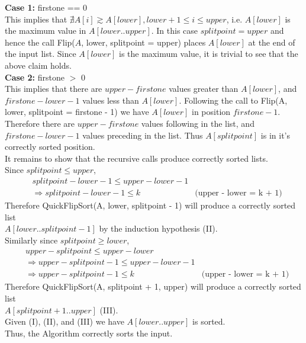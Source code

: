 \documentclass[12pt]{article}
\newenvironment{lemma}[2][Lemma]{\begin{trivlist}
\item[\hskip \labelsep {\bfseries #1}\hskip \labelsep {\bfseries #2.}]}{\end{trivlist}}
\newenvironment{question}[2][Question]{\begin{trivlist}
\item[\hskip \labelsep {\bfseries #1}\hskip \labelsep {\bfseries #2.}]}{\end{trivlist}}
\begin{document}
\begin{question}{1 (b)}
\begin{lemma}{1.5}
    \textbf{Case 1:} firstone == 0 \\
    This implies that $\nexists A[i] \gtrsim A[lower], lower + 1 \leq i \leq upper$,
    i.e. $A[lower]$ is the maximum value in $A[lower..upper]$.
    In this case $splitpoint = upper$ and hence the call Flip($A$, lower, splitpoint = upper)
    places $A[lower]$ at the end of the input list.  Since $A[lower]$ is the maximum
    value, it is trivial to see that the above claim holds. \\

    \textbf{Case 2:} firstone $>$ 0 \\
    This implies that there are $upper - firstone$ values greater than $A[lower]$,
    and $firstone - lower - 1$ values less than $A[lower]$.  Following the call
    to Flip(A, lower, splitpoint = firstone - 1) we have $A[lower]$ in position
    $firstone - 1$.  Therefore there are $upper - firstone$ values following
    in the list, and $firstone - lower - 1$ values preceding in the list.
    Thus $A[splitpoint]$ is in it's correctly sorted position. \\

    It remains to show that the recursive calls produce correctly sorted lists.\\
    Since $splitpoint \leq upper$,
    \begin{align*}
      & splitpoint - lower - 1 \leq upper - lower - 1 &\\
      & \Rightarrow splitpoint - lower - 1 \leq k & \text{(upper - lower = k + 1)}
    \end{align*}
    Therefore QuickFlipSort(A, lower, splitpoint - 1) will produce a correctly
    sorted list \\$A[lower..splitpoint - 1]$ by the induction hypothesis (II).\\
    Similarly since $splitpoint \geq lower$,
    \begin{align*}
      & upper - splitpoint \leq upper - lower & \\
      & \Rightarrow upper - splitpoint - 1 \leq upper - lower - 1 &\\
      & \Rightarrow upper - splitpoint - 1 \leq k & \text{(upper - lower = k + 1)}
    \end{align*}
    Therefore QuickFlipSort(A, splitpoint + 1, upper) will produce a correctly sorted
    list \\$A[splitpoint+1..upper]$ (III). \\
    Given (I), (II), and (III) we have $A[lower..upper]$ is sorted.\\
    Thus, the Algorithm correctly sorts the input.
  \end{lemma}


\end{question}
\end{document}
